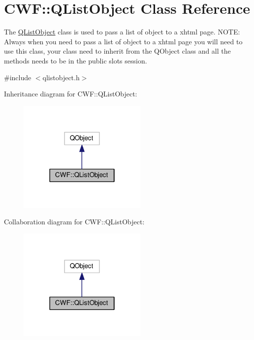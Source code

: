 \hypertarget{class_c_w_f_1_1_q_list_object}{\section{C\+W\+F\+:\+:Q\+List\+Object Class Reference}
\label{class_c_w_f_1_1_q_list_object}
}


The \hyperlink{class_c_w_f_1_1_q_list_object}{Q\+List\+Object} class is used to pass a list of object to a xhtml page. N\+O\+T\+E\+: Always when you need to pass a list of object to a xhtml page you will need to use this class, your class need to inherit from the Q\+Object class and all the methods needs to be in the public slots session.  




{\ttfamily \#include $<$qlistobject.\+h$>$}



Inheritance diagram for C\+W\+F\+:\+:Q\+List\+Object\+:
\nopagebreak
\begin{figure}[H]
\begin{center}
\leavevmode
\includegraphics[width=178pt]{class_c_w_f_1_1_q_list_object__inherit__graph}
\end{center}
\end{figure}


Collaboration diagram for C\+W\+F\+:\+:Q\+List\+Object\+:
\nopagebreak
\begin{figure}[H]
\begin{center}
\leavevmode
\includegraphics[width=178pt]{class_c_w_f_1_1_q_list_object__coll__graph}
\end{center}
\end{figure}
